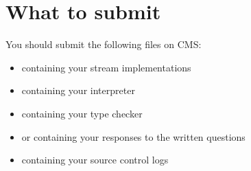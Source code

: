 \documentclass{pset}
\begin{document}
\section*{What to submit}

You should submit the following files on CMS:
\begin{itemize}
\item{}  containing your stream implementations
\item{}  containing your interpreter
\item{}  containing your type checker
\item{}  or  containing your responses to the written questions
\item{}  containing your source control logs
\end{itemize}
\end{document}
